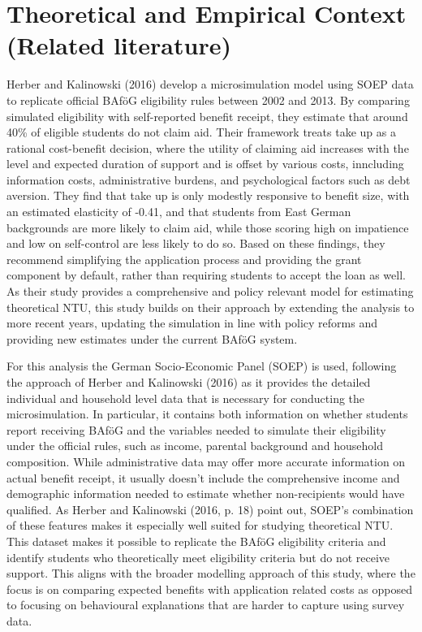 \section{Theoretical and Empirical Context (Related literature)}
\label{section:theoretical_empirical_context}

Herber and Kalinowski (2016) develop a microsimulation model using SOEP data to replicate official BAföG eligibility rules between 2002 and 2013. By comparing simulated eligibility with self-reported benefit receipt, they estimate that around 40\% of eligible students do not claim aid. Their framework treats take up as a rational cost-benefit decision, where the utility of claiming aid increases with the level and expected duration of support and is offset by various costs, inncluding information costs, administrative burdens, and psychological factors such as debt aversion. They find that take up is only modestly responsive to benefit size, with an estimated elasticity of -0.41, and that students from East German backgrounds are more likely to claim aid, while those scoring high on impatience and low on self-control are less likely to do so. Based on these findings, they recommend simplifying the application process and providing the grant component by default, rather than requiring students to accept the loan as well. As their study provides a comprehensive and policy relevant model for estimating theoretical NTU, this study builds on their approach by extending the analysis to more recent years, updating the simulation in line with policy reforms and providing new estimates under the current BAföG system.

For this analysis the German Socio-Economic Panel (SOEP) is used, following the approach of Herber and Kalinowski (2016) as it provides the detailed individual and household level data that is necessary for conducting the microsimulation. In particular, it contains both information on whether students report receiving BAföG and the variables needed to simulate their eligibility under the official rules, such as income, parental background and household composition. While administrative data may offer more accurate information on actual benefit receipt, it usually doesn’t include the comprehensive income and demographic information needed to estimate whether non-recipients would have qualified. As Herber and Kalinowski (2016, p. 18) point out, SOEP’s combination of these features makes it especially well suited for studying theoretical NTU. This dataset makes it possible to replicate the BAföG eligibility criteria and identify students who theoretically meet eligibility criteria but do not receive support. This aligns with the broader modelling approach of this study, where the focus is on comparing expected benefits with application related costs as opposed to focusing on behavioural explanations that are harder to capture using survey data. 


